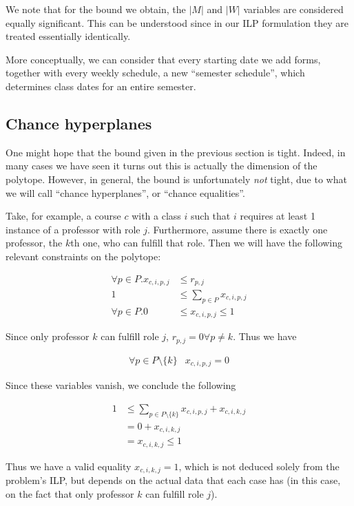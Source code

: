 We note that for the bound we obtain, the $|M|$ and $|W|$ variables are considered equally significant. This can be understood since in our ILP formulation they are treated essentially identically.

More conceptually, we can consider that every starting date we add forms, together with every weekly schedule, a new ``semester schedule'', which determines class dates for an entire semester.

\subsection{Chance hyperplanes}

One might hope that the bound given in the previous section is tight. Indeed, in many cases we have seen it turns out this is actually the dimension of the polytope. However, in general, the bound is unfortunately \emph{not} tight, due to what we will call ``chance hyperplanes'', or ``chance equalities''.

Take, for example, a course $c$ with a class $i$ such that $i$ requires at least 1 instance of a professor with role $j$. Furthermore, assume there is exactly one professor, the $k$th one, who can fulfill that role. Then we will have the following relevant constraints on the polytope:

\begin{align*}
\forall p \in P. x_{c, i, p, j} &\le r_{p, j}\\
1 &\le \sum_{p \in P} x_{c, i, p, j}\\
\forall p \in P. 0 &\le x_{c, i, p, j} \le 1
\end{align*}

Since only professor $k$ can fulfill role $j$, $r_{p, j} = 0 \forall p \ne k$. Thus we have

\begin{align*}
\forall p \in P \setminus \{k\} & x_{c, i, p, j} = 0
\end{align*}

Since these variables vanish, we conclude the following

\begin{align*}
1 &\le \sum_{p \in P \setminus \{k\}} x_{c, i, p, j} + x_{c, i, k, j}\\
  &= 0 + x_{c, i, k, j}\\
  &= x_{c, i, k, j} \le 1
\end{align*}

Thus we have a valid equality $x_{c, i, k, j} = 1$, which is not deduced solely from the problem's ILP, but depends on the actual data that each case has (in this case, on the fact that only professor $k$ can fulfill role $j$).

